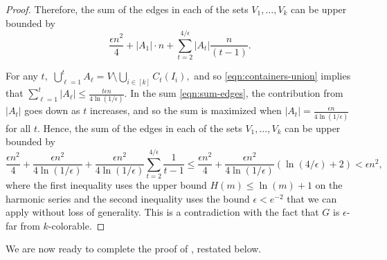 \documentclass[11pt]{article}
\begin{document}
\begin{proof}
    Therefore, the sum of the edges in each of the sets $V_1, \dots, V_k$ can be upper bounded by
    \begin{equation}
        \label{eqn:sum-edges}
        \frac{\epsilon n^2}{4}+|A_1|\cdot n+\sum_{t = 2}^{4/\epsilon} |A_t| \frac{n}{(t-1)}.
    \end{equation}
    
    For any $t,$ $\bigcup_{\ell = 1}^t A_\ell = V \setminus \bigcup_{i \in [k]} C_t(I_i),$ and so \eqref{eqn:containers-union} implies that $\sum_{\ell = 1}^{t} |A_\ell| \leq \frac{t \epsilon n}{4\ln(1/\epsilon)}.$ In the sum \eqref{eqn:sum-edges}, the contribution from $|A_t|$ goes down as $t$ increases, and so the sum is maximized when $|A_t|=\frac{\epsilon n}{4\ln(1/\epsilon)}$ for all $t.$ Hence, the sum of the edges in each of the sets $V_1, \dots, V_k$ can be upper bounded by
    \[\frac{\epsilon n^2}{4}+\frac{\epsilon n^2}{4 \ln(1/\epsilon)} + \frac{\epsilon n^2}{4 \ln(1/\epsilon)}\sum_{t=2}^{4/\epsilon} \frac{1}{t-1} \leq \frac{\epsilon n^2}{4}+ \frac{\epsilon n^2}{4 \ln(1/\epsilon)}\left(\ln(4/\epsilon)+2\right) < \epsilon n^2,\]
    where the first inequality uses the upper bound $H(m) \le \ln(m) + 1$ on the harmonic series and the second inequality uses the bound $\epsilon < e^{-2}$ that we can apply without loss of generality. This is a contradiction with the fact that $G$ is $\epsilon$-far from $k$-colorable.
\end{proof}

We are now ready to complete the proof of , restated below.
\end{document}
